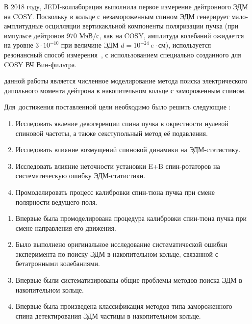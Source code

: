 В 2018 году, JEDI-коллаборация выполнила первое измерение дейтронного ЭДМ на COSY. Поскольку в кольце с
незамороженным спином ЭДМ генерирует мало-амплитудные осцилляции вертикакльной компоненты поляризации пучка
(при импульсе дейтронов 970 МэВ/с, как на COSY, амплитуда колебаний ожидается на уровне $3\cdot10^{-10}$
при величине ЭДМ $d = 10^{-24}~e\cdot$см), используется резонансный
способ измерения~\cite{COSY:Partially-Frozen-Spin, COSY:SpinTuneMapping}, с использованием специально созданного для COSY ВЧ Вин-фильтра.~\cite{JSlim:RFWF:Design, JSlim:RFWF:Commisioning}


{\aim} данной работы является численное моделирование метода поиска электрического дипольного момента дейтрона в накопительном кольце с замороженным спином.

Для~достижения поставленной цели необходимо было решить следующие {\tasks}:
\begin{enumerate}
  \item Исследовать явление декогеренции спина пучка в окрестности нулевой спиновой частоты, а также секступольный метод её подавления. 
  \item Исследовать влияние возмущений спиновой динамики на ЭДМ-статистику.
  \item Исследовать влияние неточности установки E+B спин-ротаторов на систематическую ошибку ЭДМ-статистики.
  \item Промоделировать процесс калибровки спин-тюна пучка при смене полярности ведущего поля.
\end{enumerate}


{\novelty}
\begin{enumerate}
  \item Впервые была промоделирована процедура калибровки спин-тюна пучка при смене направления его движения. 
  \item Было выполнено оригинальное исследование систематической ошибки эксперимента по поиску ЭДМ в накопительном кольце, связанной с бетатронными колебаниями.
  \item Впервые были систематизированы общие проблемы методов поиска ЭДМ в накопительном кольце.
  \item Впервые была произведена классификация методов типа замороженного спина детектирования ЭДМ частицы в накопительном кольце.
\end{enumerate}

